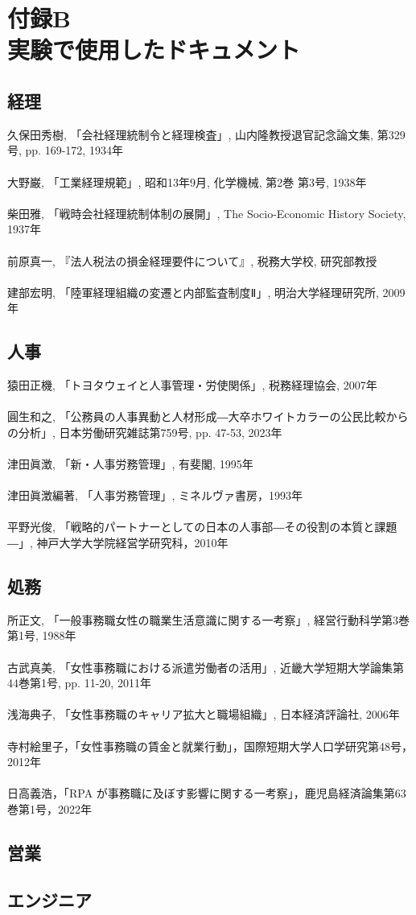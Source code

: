 \chapter*{付録B\\実験で使用したドキュメント}

\setlength{\parindent}{0pt}

\section*{経理}
久保田秀樹, 「会社経理統制令と経理検査」, 山内隆教授退官記念論文集, 第329号, pp. 169-172, 1934年
\\\\
大野巌, 「工業経理規範」, 昭和13年9月, 化学機械, 第2巻 第3号, 1938年
\\\\
柴田雅, 「戦時会社経理統制体制の展開」, The Socio-Economic History Society, 1937年
\\\\
前原真一, 『法人税法の損金経理要件について』, 税務大学校, 研究部教授
\\\\
建部宏明, 「陸軍経理組織の変遷と内部監査制度Ⅱ」, 明治大学経理研究所, 2009年

\section*{人事}
猿田正機, 「トヨタウェイと人事管理・労使関係」, 税務経理協会, 2007年
\\\\
圓生和之, 「公務員の人事異動と人材形成―大卒ホワイトカラーの公民比較からの分析」, 日本労働研究雑誌第759号, pp. 47-53, 2023年
\\\\
津田眞澂, 「新・人事労務管理」, 有斐閣, 1995年
\\\\
津田眞澂編著, 「人事労務管理」, ミネルヴァ書房，1993年
\\\\
平野光俊, 「戦略的パートナーとしての日本の人事部―その役割の本質と課題―」, 神戸大学大学院経営学研究科，2010年

\clearpage
\section*{処務}
所正文, 「一般事務職女性の職業生活意識に関する一考察」, 経営行動科学第3巻第1号, 1988年
\\\\
古武真美, 「女性事務職における派遣労働者の活用」, 近畿大学短期大学論集第44巻第1号, pp. 11-20, 2011年
\\\\
浅海典子, 「女性事務職のキャリア拡大と職場組織」, 日本経済評論社, 2006年
\\\\
寺村絵里子，「女性事務職の賃金と就業行動」，国際短期大学人口学研究第48号，2012年
\\\\
日高義浩，「RPA が事務職に及ぼす影響に関する一考察」，鹿児島経済論集第63巻第1号，2022年

\section*{営業}

\clearpage
\section*{エンジニア}
